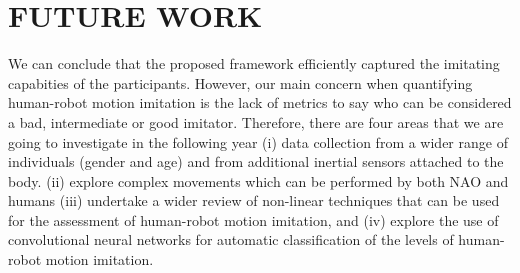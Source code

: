 \documentclass{sig-alternate-05-2015}
\begin{document}
\section{FUTURE WORK}

We can conclude that the proposed framework efficiently captured the imitating capabities of the participants.
However, our main concern when quantifying human-robot motion imitation
is the lack of metrics to say who can be considered a bad, intermediate or good imitator.
Therefore, there are four areas that we are going to investigate in the following year
(i) data collection from a wider range of individuals (gender and age)
and from additional inertial sensors attached to the body.
(ii) explore complex movements which can be performed by both NAO and humans
(iii) undertake a wider review of non-linear techniques that can be used for 
the assessment of human-robot motion imitation, and
(iv) explore the use of convolutional neural networks for automatic 
classification of the levels of human-robot motion imitation.






%
%
\end{document}
